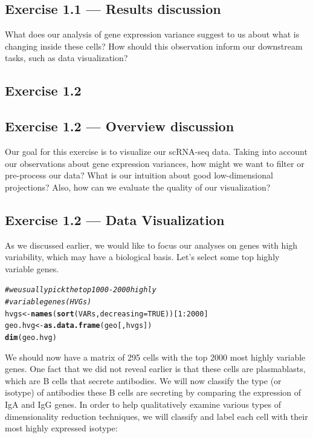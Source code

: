 \documentclass{tufte-book}\usepackage[]{graphicx}\usepackage[]{xcolor}
\makeatletter
\newcommand{\hlnum}[1]{\textcolor[rgb]{0.686,0.059,0.569}{#1}}%
\newcommand{\hlcom}[1]{\textcolor[rgb]{0.678,0.584,0.686}{\textit{#1}}}%
\newcommand{\hlopt}[1]{\textcolor[rgb]{0,0,0}{#1}}%
\newcommand{\hldef}[1]{\textcolor[rgb]{0.345,0.345,0.345}{#1}}%
\newcommand{\hlkwb}[1]{\textcolor[rgb]{0.69,0.353,0.396}{#1}}%
\newcommand{\hlkwc}[1]{\textcolor[rgb]{0.333,0.667,0.333}{#1}}%
\newcommand{\hlkwd}[1]{\textcolor[rgb]{0.737,0.353,0.396}{\textbf{#1}}}%
\newenvironment{kframe}{%
 \def\at@end@of@kframe{}%
 \ifinner\ifhmode%
  \def\at@end@of@kframe{\end{minipage}}%
  \begin{minipage}{\columnwidth}%
 \fi\fi%
 \def\FrameCommand##1{\hskip\@totalleftmargin \hskip-\fboxsep
 \colorbox{shadecolor}{##1}\hskip-\fboxsep
     \hskip-\linewidth \hskip-\@totalleftmargin \hskip\columnwidth}%
 \MakeFramed {\advance\hsize-\width
   \@totalleftmargin\z@ \linewidth\hsize
   \@setminipage}}%
 {\par\unskip\endMakeFramed%
 \at@end@of@kframe}
\newenvironment{knitrout}{}{} %
\makeatother
\begin{document}
\subsection{Exercise 1.1 --- Results discussion}
What does our analysis of gene expression variance suggest to us about what is changing inside these cells?  How should this observation inform our downstream tasks, such as data visualization?

\subsection{\textbf{Exercise 1.2}}
\subsection{Exercise 1.2 --- Overview discussion}
Our goal for this exercise is to visualize our scRNA-seq data. Taking into account our observations about gene expression variances, how might we want to filter or pre-process our data? What is our intuition about good low-dimensional projections? Also, how can we evaluate the quality of our visualization?



\subsection{Exercise 1.2 --- Data Visualization}

As we discussed earlier, we would like to focus our analyses on genes with high variability, which may have a biological basis.  Let's select some top highly variable genes.

\begin{knitrout}
\color{fgcolor}\begin{kframe}
\begin{alltt}
\hlcom{# we usually pick the top 1000 - 2000 highly}
\hlcom{#   variable genes (HVGs)}
\hldef{hvgs} \hlkwb{<-} \hlkwd{names}\hldef{(}\hlkwd{sort}\hldef{(VARs,} \hlkwc{decreasing} \hldef{=} \hlnum{TRUE}\hldef{))[}\hlnum{1}\hlopt{:}\hlnum{2000}\hldef{]}
\hldef{geo.hvg} \hlkwb{<-} \hlkwd{as.data.frame}\hldef{(geo[,hvgs])}
\hlkwd{dim}\hldef{(geo.hvg)}
\end{alltt}
\end{kframe}
\end{knitrout}

\noindent We should now have a matrix of 295 cells with the top 2000 most highly variable genes.
\hbox{}
\noindent One fact that we did not reveal earlier is that these cells are plasmablasts, which are B cells that secrete antibodies.    We will now classify the type (or isotype) of antibodies these B cells are secreting by comparing the expression of IgA and IgG genes.  In order to help qualitatively examine various types of dimensionality reduction techniques, we will classify and label each cell with their most highly expressed isotype:
\end{document}
